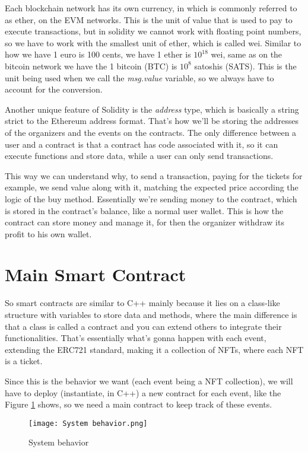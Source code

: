 Each blockchain network has its own currency, in which is commonly referred to as ether, on the EVM networks. This is the unit of value that is used to pay to execute transactions, but in solidity we cannot work with floating point numbers, so we have to work with the smallest unit of ether, which is called wei. Similar to how we have 1 euro is 100 cents, we have 1 ether is $10^{18}$ wei, same as on the bitcoin network we have the 1 bitcoin (BTC) is $10^{8}$ satoshis (SATS). This is the unit being used when we call the \textit{msg.value} variable, so we always have to account for the conversion.

Another unique feature of Solidity is the \textit{address} type, which is basically a string strict to the Ethereum address format. That's how we'll be storing the addresses of the organizers and the events on the contracts. The only difference between a user and a contract is that a contract has code associated with it, so it can execute functions and store data, while a user can only send transactions.

This way we can understand why, to send a transaction, paying for the tickets for example, we send value along with it, matching the expected price according the logic of the buy method. Essentially we're sending money to the contract, which is stored in the contract's balance, like a normal user wallet. This is how the contract can store money and manage it, for then the organizer withdraw its profit to his own wallet.

\section{Main Smart Contract}
\label{sec:main_smart_contract}

So smart contracts are similar to C++ mainly because it lies on a class-like structure with variables to store data and methods, where the main difference is that a class is called a contract and you can extend others to integrate their functionalities. That's essentially what's gonna happen with each event, extending the ERC721 standard, making it a collection of NFTs, where each NFT is a ticket.

Since this is the behavior we want (each event being a NFT collection), we will have to deploy (instantiate, in C++) a new contract for each event, like the Figure \ref{fig:system_behavior} shows, so we need a main contract to keep track of these events.

\begin{figure}[H]
    \texttt{[image: System behavior.png]}
    \centering
    \caption{System behavior}
    \label{fig:system_behavior}
\end{figure}

